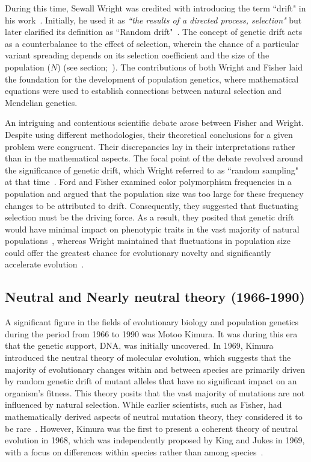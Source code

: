 During this time, Sewall Wright was credited with introducing the term “drift" in his work~\citep{wright_evolution_1929}. Initially, he used it as \textit{“the results of a directed process, selection"} but later clarified its definition as “Random drift"~\citep{wright_random_1970}. The concept of genetic drift acts as a counterbalance to the effect of selection, wherein the chance of a particular variant spreading depends on its selection coefficient and the size of the population ($N$) (see  section;~\citet{wright_evolution_1931, wright_sewall_and_others_roles_1932}). The contributions of both Wright and Fisher laid the foundation for the development of population genetics, where mathematical equations were used to establish connections between natural selection and Mendelian genetics.

An intriguing and contentious scientific debate arose between Fisher and Wright. Despite using different methodologies, their theoretical conclusions for a given problem were congruent. Their discrepancies lay in their interpretations rather than in the mathematical aspects. The focal point of the debate revolved around the significance of genetic drift, which Wright referred to as “random sampling" at that time~\citep{wright_fisher_1951}. Ford and Fisher examined color polymorphism frequencies in a population and argued that the population size was too large for these frequency changes to be attributed to drift. Consequently, they suggested that fluctuating selection must be the driving force. As a result, they posited that genetic drift would have minimal impact on phenotypic traits in the vast majority of natural populations~\citep{fisher_sewall_1950, ohara_comparing_2005}, whereas Wright maintained that fluctuations in population size could offer the greatest chance for evolutionary novelty and significantly accelerate evolution~\citep{bacaer_wright_2011}.

\subsection{Neutral and Nearly neutral theory (1966-1990)}

A significant figure in the fields of evolutionary biology and population genetics during the period from 1966 to 1990 was Motoo Kimura. It was during this era that the genetic support, DNA, was initially uncovered. In 1969, Kimura introduced the neutral theory of molecular evolution, which suggests that the majority of evolutionary changes within and between species are primarily driven by random genetic drift of mutant alleles that have no significant impact on an organism's fitness. This theory posits that the vast majority of mutations are not influenced by natural selection. While earlier scientists, such as Fisher, had mathematically derived aspects of neutral mutation theory, they considered it to be rare~\citep{fisher_xviidistribution_1931}. However, Kimura was the first to present a coherent theory of neutral evolution in 1968, which was independently proposed by King and Jukes in 1969, with a focus on differences within species rather than among species~\citep{kimura_evolutionary_1968, king_non-darwinian_1969}.


